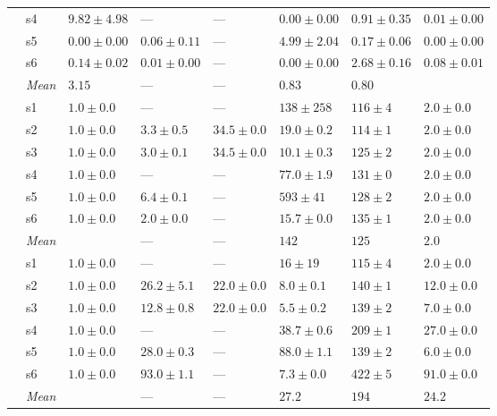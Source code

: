\begin{table}[t]
\begin{tabular}{@{}ll *{6}{M}@{}}
  & s4 &  $9.82\pm4.98$ & — & — &  $0.00\pm0.00$ &  $0.91\pm0.35$ &  $0.01\pm0.00$ \\
  & s5 &  $0.00\pm0.00$ &  $0.06\pm0.11$ & — &  $4.99\pm2.04$ &  $0.17\pm0.06$ &  $0.00\pm0.00$ \\
  & s6 &  $0.14\pm0.02$ &  $0.01\pm0.00$ & — &  $0.00\pm0.00$ &  $2.68\pm0.16$ &  $0.08\pm0.01$ \\
\cmidrule(lr){2-8}
  & \textit{Mean} &  $3.15$ & — & — &  $0.83$ &  $0.80$ &   \\
\midrule
{}
  & s1 &  $1.0\pm0.0$ & — & — &  $138\pm258$ &  $116\pm4$ &  $2.0\pm0.0$ \\
  & s2 &  $1.0\pm0.0$ &  $3.3\pm0.5$ &  $34.5\pm0.0$ &  $19.0\pm0.2$ &  $114\pm1$ &  $2.0\pm0.0$ \\
  & s3 &  $1.0\pm0.0$ &  $3.0\pm0.1$ &  $34.5\pm0.0$ &  $10.1\pm0.3$ &  $125\pm2$ &  $2.0\pm0.0$ \\
  & s4 &  $1.0\pm0.0$ & — & — &  $77.0\pm1.9$ &  $131\pm0$ &  $2.0\pm0.0$ \\
  & s5 &  $1.0\pm0.0$ &  $6.4\pm0.1$ & — &  $593\pm41$ &  $128\pm2$ &  $2.0\pm0.0$ \\
  & s6 &  $1.0\pm0.0$ &  $2.0\pm0.0$ & — &  $15.7\pm0.0$ &  $135\pm1$ &  $2.0\pm0.0$ \\
\cmidrule(lr){2-8}
  & \textit{Mean} &   & — & — &  $142$ &  $125$ &  $2.0$ \\
\midrule
{}
  & s1 &  $1.0\pm0.0$ & — & — &  $16\pm19$ &  $115\pm4$ &  $2.0\pm0.0$ \\
  & s2 &  $1.0\pm0.0$ &  $26.2\pm5.1$ &  $22.0\pm0.0$ &  $8.0\pm0.1$ &  $140\pm1$ &  $12.0\pm0.0$ \\
  & s3 &  $1.0\pm0.0$ &  $12.8\pm0.8$ &  $22.0\pm0.0$ &  $5.5\pm0.2$ &  $139\pm2$ &  $7.0\pm0.0$ \\
  & s4 &  $1.0\pm0.0$ & — & — &  $38.7\pm0.6$ &  $209\pm1$ &  $27.0\pm0.0$ \\
  & s5 &  $1.0\pm0.0$ &  $28.0\pm0.3$ & — &  $88.0\pm1.1$ &  $139\pm2$ &  $6.0\pm0.0$ \\
  & s6 &  $1.0\pm0.0$ &  $93.0\pm1.1$ & — &  $7.3\pm0.0$ &  $422\pm5$ &  $91.0\pm0.0$ \\
\cmidrule(lr){2-8}
  & \textit{Mean} &   & — & — &  $27.2$ &  $194$ &  $24.2$ \\
\bottomrule
\end{tabular}
\end{table}
